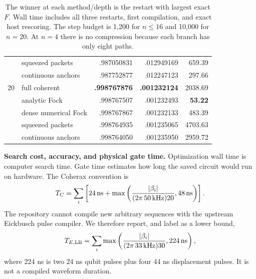 \documentclass[10pt]{article}
\begin{document}
\begin{table}[H]
\begin{tabular}{r l r r r}
   & squeezed packets & .987050831 & .012949169 & 659.39\\
   & continuous anchors & .987752877 & .012247123 & 297.66\\
\midrule
20 & full coherent & \textbf{.998767876} & \textbf{.001232124} & 2038.69\\
   & analytic Fock & .998767507 & .001232493 & \textbf{53.22}\\
   & dense numerical Fock & .998767867 & .001232133 & 483.39\\
   & squeezed packets & .998764935 & .001235065 & 4703.63\\
   & continuous anchors & .998764050 & .001235950 & 2959.72\\
\bottomrule
\end{tabular}
\caption{The winner at each method/depth is the restart with largest exact
$F$. Wall time includes all three restarts, first compilation, and exact host
rescoring. The step
budget is 1,200 for $n\leq16$ and 10,000 for $n=20$. At $n=4$ there is no
compression because each branch has only eight paths.}
\end{table}

\newpage
\textbf{Search cost, accuracy, and physical gate time.}
Optimization wall time is computer search time.  Gate time estimates how long
the saved circuit would run on hardware.  The Coherax convention is
\[
T_C=\sum_i\left[24\,{\rm ns}+\max\left(
\frac{|\beta_i|}{(2\pi\,50\,{\rm kHz})20},48\,{\rm ns}\right)\right].
\]
The repository cannot compile new arbitrary sequences with the upstream
Eickbusch pulse compiler.  We therefore report, and label as a lower bound,
\[
T_{E,{\rm LB}}=\sum_i\max\left(
\frac{|\beta_i|}{(2\pi\,33\,{\rm kHz})30},224\,{\rm ns}\right),
\]
where 224 ns is two 24 ns qubit pulses plus four 44 ns displacement pulses.
It is not a compiled waveform duration.
\end{document}
